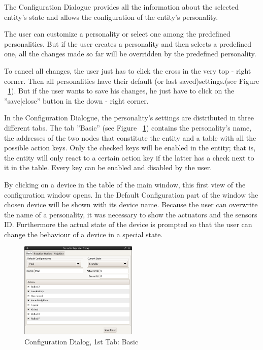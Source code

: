 The Configuration Dialogue provides all the information about the selected entity's state and allows the configuration of the entity's personality. 

The user can customize a personality or select one among the predefined personalities. But if the user creates a personality and then selects a predefined one, all the changes made so far will be overridden by the predefined personality. 

To cancel all changes, the user just has to click the cross in the very top - right corner. Then all personalities have their default (or last saved)settings.(see Figure ~\ref{fig:java-server-config01}). But if the user wants to save his changes, he just have to click on the ''save|close'' button in the down - right corner.    

In the Configuration Dialogue, the personality's settings are distributed in three different tabs. The tab ''Basic'' (see Figure ~\ref{fig:java-server-config01}) contains the personality's name, the addresses of the two nodes that constitute the entity and a table with all the possible action keys. Only the checked keys will be enabled in the entity; that is, the entity will only react to a certain action key if the latter has a check next to it in the table. Every key can be enabled and disabled by the user. 

By clicking on a device in the table of the main window, this first view of the configuration window opens. In the Default Configuration part of the window the chosen device will be shown with its device name. Because the user can overwrite the name of a personality, it was necessary to show the actuators and the sensors ID.
Furthermore the actual state of the device is prompted so that the user can change the behaviour of a device in a special state. 


\begin{figure}[h!]
 \centering
 \includegraphics[width= 0.5\textwidth, clip=true  ,keepaspectratio=true]{./pic/java-server-config01.png}
 \caption{Configuration Dialog, 1st Tab: Basic}
 \label{fig:java-server-config01}
\end{figure}


